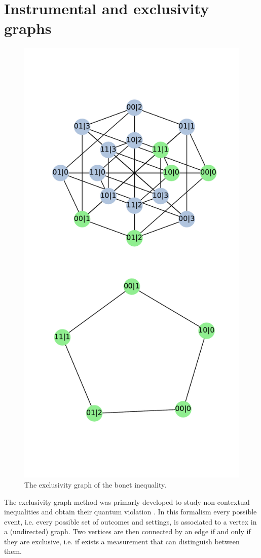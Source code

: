 \documentclass[floatfix, twocolumn, aps, prl]{revtex4-1}
\begin{document}
\section*{Instrumental and exclusivity graphs}
\begin{figure}[h]
    \centering
    \includegraphics[width=.8\columnwidth]{images/instrumental_c5.pdf}
    \caption{The exclusivity graph of the bonet inequality.}
    \label{fig:bonetexc}
\end{figure}
The exclusivity graph method was primarly developed to study
non-contextual inequalities and obtain their quantum violation
\cite{cabello2014}. %
In this formalism every possible event, i.e. every possible set of outcomes and
settings, is associated to a vertex in a (undirected) graph.
Two vertices are then connected by an edge if and only if they are exclusive,
i.e. if exists a measurement that can distinguish between them. %
\end{document}
